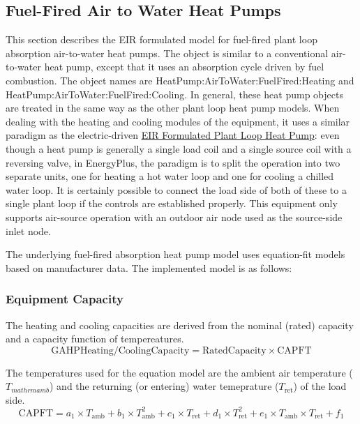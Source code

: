 \subsection{Fuel-Fired Air to Water Heat Pumps}\label{fuel-fired-air-to-water-heat-pumps}

This section describes the EIR formulated model for fuel-fired plant loop absorption air-to-water heat pumps. The object is similar to a conventional air-to-water heat pump, except that it uses an absorption cycle driven by fuel combustion. The object names are HeatPump:AirToWater:FuelFired:Heating and HeatPump:AirToWater:FuelFired:Cooling. In general, these heat pump objects are treated in the same way as the other plant loop heat pump models. When dealing with the heating and cooling modules of the equipment, it uses a similar paradigm as the electric-driven \hyperref[eir-plant-loop-heat-pump-model]{EIR Formulated Plant Loop Heat Pump}: even though a heat pump is generally a single load coil and a single source coil with a reversing valve, in EnergyPlus, the paradigm is to split the operation into two separate units, one for heating a hot water loop and one for cooling a chilled water loop. It is certainly possible to connect the load side of both of these to a single plant loop if the controls are established properly. This equipment only supports air-source operation with an outdoor air node used as the source-side inlet node.

The underlying fuel-fired absorption heat pump model uses equation-fit models based on manufacturer data. The implemented model is as follows: 

\subsubsection{Equipment Capacity}
The heating and cooling capacities are derived from the nominal (rated) capacity and a capacity function of tempereatures. 
\begin{equation}
\mathrm{GAHP Heating/Cooling Capacity} = \mathrm{Rated Capacity} \times \mathrm{CAPFT}
\end{equation}

The temperatures used for the equation model are the ambient air temperature ($T_{mathrm{amb}}$) and the returning (or entering) water temeprature ($T_{\mathrm{ret}}$) of the load side.
\begin{equation}
\mathrm{CAPFT} = a_1 \times T_{\mathrm{amb}} + b_1 \times T_{\mathrm{amb}}^{2} + c_1 \times T_{\mathrm{ret}} + d_1 \times T_{\mathrm{ret}}^{2} + e_1 \times T_{\mathrm{amb}} \times T_{\mathrm{ret}} + f_1
\end{equation}

